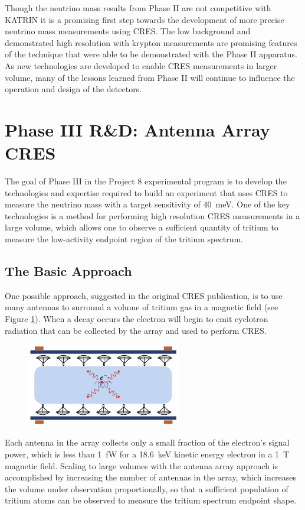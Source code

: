 Though the neutrino mass results from Phase II are not competitive with KATRIN it is a promising first step towards the development of more precise neutrino mass measurements using CRES. The low background and demonstrated high resolution with krypton measurements are promising features of the technique that were able to be demonstrated with the Phase II apparatus. As new technologies are developed to enable CRES measurements in larger volume, many of the lessons learned from Phase II will continue to influence the operation and design of the detectors.

\section{Phase III R\&D: Antenna Array CRES}
\label{sec:chap3-phaseIII-antenna-arrays}

The goal of Phase III in the Project 8 experimental program is to develop the technologies and expertise required to build an experiment that uses CRES to measure the neutrino mass with a target sensitivity of 40~meV. One of the key technologies is a method for performing high resolution CRES measurements in a large volume, which allows one to observe a sufficient quantity of tritium to measure the low-activity endpoint region of the tritium spectrum. 

\subsection{The Basic Approach}

One possible approach, suggested in the original CRES publication, is to use many antennas to surround a volume of tritium gas in a magnetic field (see Figure \ref{fig:chap3-antenna-concept-cartoon}). When a decay occurs the electron will begin to emit cyclotron radiation that can be collected by the array and used to perform CRES.
\begin{figure}[htbp]
    \centering
    \includegraphics*[width=0.6\textwidth]{figs/Chapter-3/230614_antenna_cartoon.png}
    \caption{\label{fig:chap3-antenna-concept-cartoon}}
\end{figure}
Each antenna in the array collects only a small fraction of the electron's signal power, which is less than 1~fW for a 18.6~keV kinetic energy electron in a 1~T magnetic field. Scaling to large volumes with the antenna array approach is accomplished by increasing the number of antennas in the array, which increases the volume under observation proportionally, so that a sufficient population of tritium atoms can be observed to measure the tritium spectrum endpoint shape. 

